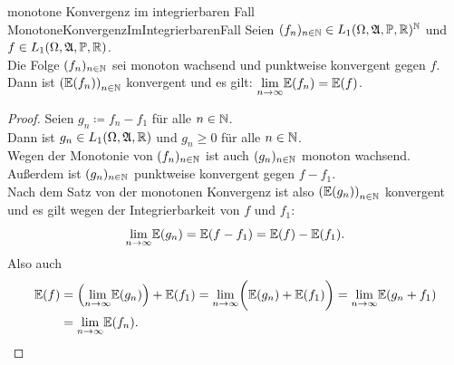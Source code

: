 \begin{lemma}{monotone Konvergenz im integrierbaren Fall}
             {MonotoneKonvergenzImIntegrierbarenFall}
Seien $(f_{n})_{n \in \mathbb{N}} \in L_1(\Omega, \mathfrak{A}, \mathbb{P}, \mathbb{R})^{\mathbb{N}}$ und 
$f \in L_1(\Omega, \mathfrak{A}, \mathbb{P}, \mathbb{R})$.\\
Die Folge $(f_{n})_{n \in \mathbb{N}}$ sei monoton wachsend und punktweise konvergent gegen
$f$.\\
Dann ist $\left(\mathbb{E}(f_n) \right)_{n \in \mathbb{N}}$ konvergent und es gilt:
$ \underset{n\to \infty}{\lim} \mathbb{E}(f_n) = \mathbb{E}(f)$.
\end{lemma}
\begin{proof}
Seien $g_n \coloneqq  f_n - f_1$ für alle $n \in \mathbb{N}$.\\
Dann ist $g_n \in L_1(\Omega, \mathfrak{A}, \mathbb{R})$ und $g_n \ge 0$ für alle $n \in \mathbb{N}$.\\
Wegen der Monotonie von $(f_{n})_{n \in \mathbb{N}}$ ist auch $(g_{n})_{n \in \mathbb{N}}$ monoton
wachsend.\\
Außerdem ist $(g_{n})_{n \in \mathbb{N}}$ punktweise konvergent gegen $f - f_1$.\\
Nach dem Satz von der monotonen Konvergenz ist also 
$\left(\mathbb{E}(g_n) \right)_{n \in \mathbb{N}}$ konvergent und es gilt wegen der 
Integrierbarkeit von $f$ und $f_1$:
\[\underset{n\to \infty}{\lim} \mathbb{E}(g_n) = \mathbb{E}(f - f_1) = \mathbb{E}(f) - \mathbb{E}(f_1)\text.\]
Also auch
\begin{align*}
\mathbb{E}(f) & = \left(\underset{n\to \infty}{\lim} \mathbb{E}(g_n) \right) + \mathbb{E}(f_1)
        = \underset{n\to \infty}{\lim} \bigg(\mathbb{E}(g_n) + \mathbb{E}(f_1) \bigg)
       = \underset{n\to \infty}{\lim} \mathbb{E}(g_n + f_1)\\
        &= \underset{n\to \infty}{\lim} \mathbb{E}(f_n)\text.
\end{align*}
\end{proof}